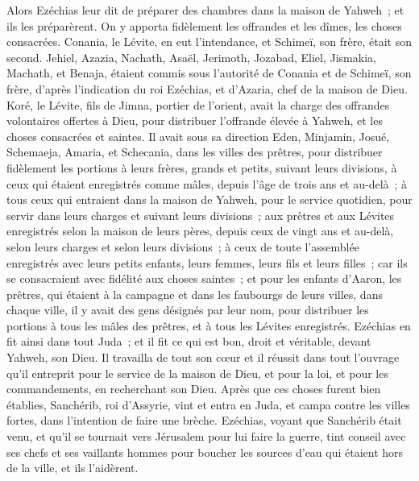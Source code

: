 \begin{multicols}{2}
Alors Ezéchias leur dit de préparer des chambres dans la maison de Yahweh~; et ils les préparèrent.
On y apporta fidèlement les offrandes et les dîmes, les choses consacrées. Conania, le Lévite, en eut l'intendance, et Schimeï, son frère, était son second.
Jehiel, Azazia, Nachath, Asaël, Jerimoth, Jozabad, Eliel, Jismakia, Machath, et Benaja, étaient commis sous l'autorité de Conania et de Schimeï, son frère, d'après l'indication du roi Ezéchias, et d'Azaria, chef de la maison de Dieu.
Koré, le Lévite, fils de Jimna, portier de l'orient, avait la charge des offrandes volontaires offertes à Dieu, pour distribuer l'offrande élevée à Yahweh, et les choses consacrées et saintes.
Il avait sous sa direction Eden, Minjamin, Josué, Schemaeja, Amaria, et Schecania, dans les villes des prêtres, pour distribuer fidèlement les portions à leurs frères, grands et petits, suivant leurs divisions,
à ceux qui étaient enregistrés comme mâles, depuis l'âge de trois ans et au-delà~; à tous ceux qui entraient dans la maison de Yahweh, pour le service quotidien, pour servir dans leurs charges et suivant leurs divisions~;
aux prêtres et aux Lévites enregistrés selon la maison de leurs pères, depuis ceux de vingt ans et au-delà, selon leurs charges et selon leurs divisions~;
à ceux de toute l'assemblée enregistrés avec leurs petits enfants, leurs femmes, leurs fils et leurs filles~; car ils se consacraient avec fidélité aux choses saintes~;
et pour les enfants d'Aaron, les prêtres, qui étaient à la campagne et dans les faubourgs de leurs villes, dans chaque ville, il y avait des gens désignés par leur nom, pour distribuer les portions à tous les mâles des prêtres, et à tous les Lévites enregistrés.
Ezéchias en fit ainsi dans tout Juda~; et il fit ce qui est bon, droit et véritable, devant Yahweh, son Dieu.
Il travailla de tout son cœur et il réussit dans tout l'ouvrage qu'il entreprit pour le service de la maison de Dieu, et pour la loi, et pour les commandements, en recherchant son Dieu.
\VerseOne{}Après que ces choses furent bien établies, Sanchérib, roi d'Assyrie, vint et entra en Juda, et campa contre les villes fortes, dans l'intention de faire une brèche.
Ezéchias, voyant que Sanchérib était venu, et qu'il se tournait vers Jérusalem pour lui faire la guerre,
tint conseil avec ses chefs et ses vaillants hommes pour boucher les sources d'eau qui étaient hors de la ville, et ils l'aidèrent.

\end{multicols}
